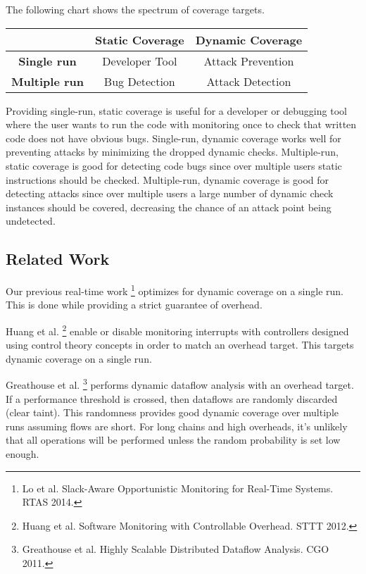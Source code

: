 \documentclass[11pt, letterpaper]{article}
\begin{document}
The following chart shows the spectrum of coverage targets.

\begin{center}
\begin{tabular}{c|c|c|}
 & \textbf{Static Coverage} & \textbf{Dynamic Coverage} \\ \hline
\textbf{Single run} & Developer Tool & Attack Prevention \\ \hline
\textbf{Multiple run} & Bug Detection & Attack Detection \\ \hline
\end{tabular}
\end{center}

Providing single-run, static coverage is useful for a developer or debugging
tool where the user wants to run the code with monitoring once to check that
written code does not have obvious bugs. Single-run, dynamic coverage works
well for preventing attacks by minimizing the dropped dynamic checks.
Multiple-run, static coverage is good for detecting code bugs since over
multiple users static instructions should be checked. Multiple-run, dynamic
coverage is good for detecting attacks since over multiple users a large number
of dynamic check instances should be covered, decreasing the chance of an
attack point being undetected.

\subsection{Related Work}

Our previous real-time work \footnote{Lo et al. Slack-Aware Opportunistic
Monitoring for Real-Time Systems. RTAS 2014.} optimizes for dynamic coverage on
a single run. This is done while providing a strict guarantee of overhead.

Huang et al. \footnote{Huang et al. Software Monitoring with Controllable
Overhead. STTT 2012.} enable or disable monitoring interrupts with controllers
designed using control theory concepts in order to match an overhead target.
This targets dynamic coverage on a single run.

Greathouse et al. \footnote{Greathouse et al. Highly Scalable Distributed
Dataflow Analysis. CGO 2011.} performs dynamic dataflow analysis with an
overhead target. If a performance threshold is crossed, then dataflows are
randomly discarded (clear taint). This randomness provides good dynamic
coverage over multiple runs assuming flows are short. For long chains and high
overheads, it's unlikely that all operations will be performed unless the
random probability is set low enough.
\end{document}
